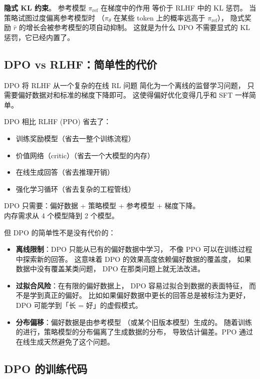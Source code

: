 \textbf{隐式 KL 约束}。
参考模型 $\pi_{\text{ref}}$ 在梯度中的作用
等价于 RLHF 中的 KL 惩罚。
当策略试图过度偏离参考模型时
（$\pi_\theta$ 在某些 token 上的概率远高于 $\pi_{\text{ref}}$），
隐式奖励 $\hat{r}$ 的增长会被参考模型的项自动抑制。
这就是为什么 DPO 不需要显式的 KL 惩罚，它已经内置了。

\subsection{DPO vs RLHF：简单性的代价}

DPO 将 RLHF 从一个复杂的在线 RL 问题
简化为一个离线的监督学习问题，
只需要偏好数据对和标准的梯度下降即可。
这使得偏好优化变得几乎和 SFT 一样简单。

\begin{corebox}
DPO 相比 RLHF (PPO) 省去了：
\begin{itemize}[noitemsep]
  \item 训练奖励模型（省去一整个训练流程）
  \item 价值网络（critic）（省去一个大模型的内存）
  \item 在线生成回答（省去推理开销）
  \item 强化学习循环（省去复杂的工程管线）
\end{itemize}
DPO 只需要：偏好数据 + 策略模型 + 参考模型 + 梯度下降。\\
内存需求从 4 个模型降到 2 个模型。
\end{corebox}

但 DPO 的简单性不是没有代价的：
\begin{itemize}[noitemsep]
  \item \textbf{离线限制}：DPO 只能从已有的偏好数据中学习，
        不像 PPO 可以在训练过程中探索新的回答。
        这意味着 DPO 的效果高度依赖偏好数据的覆盖度，
        如果数据中没有覆盖某类问题，
        DPO 在那类问题上就无法改进。
  \item \textbf{过拟合风险}：在有限的偏好数据上，
        DPO 容易过拟合到数据的表面特征，
        而不是学到真正的偏好。
        比如如果偏好数据中更长的回答总是被标注为更好，
        DPO 可能学到「长 = 好」的虚假模式。
  \item \textbf{分布偏移}：偏好数据是由参考模型
       （或某个旧版本模型）生成的。
        随着训练的进行，策略模型的分布偏离了生成数据的分布，
        导致估计偏差。PPO 通过在线生成天然避免了这个问题。
\end{itemize}

\subsection{DPO 的训练代码}

